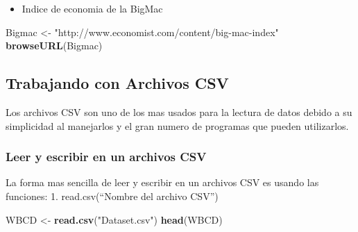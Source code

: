 \documentclass[]{article}
\newenvironment{Shaded}{\begin{snugshade}}{\end{snugshade}}
\newcommand{\KeywordTok}[1]{\textcolor[rgb]{0.13,0.29,0.53}{\textbf{#1}}}
\newcommand{\NormalTok}[1]{#1}
\newcommand{\StringTok}[1]{\textcolor[rgb]{0.31,0.60,0.02}{#1}}
\providecommand{\tightlist}{%
  \setlength{\itemsep}{0pt}\setlength{\parskip}{0pt}}
\begin{document}
\begin{itemize}
\tightlist
\item
  Indice de economia de la BigMac
\end{itemize}

\begin{Shaded}
\begin{Highlighting}[]
\NormalTok{Bigmac <-}\StringTok{ "http://www.economist.com/content/big-mac-index"}
\KeywordTok{browseURL}\NormalTok{(Bigmac)}
\end{Highlighting}
\end{Shaded}

\hypertarget{trabajando-con-archivos-csv}{%
\subsection{Trabajando con Archivos
CSV}\label{trabajando-con-archivos-csv}}

Los archivos CSV son uno de los mas usados para la lectura de datos
debido a su simplicidad al manejarlos y el gran numero de programas que
pueden utilizarlos.

\hypertarget{leer-y-escribir-en-un-archivos-csv}{%
\subsubsection{Leer y escribir en un archivos
CSV}\label{leer-y-escribir-en-un-archivos-csv}}

La forma mas sencilla de leer y escribir en un archivos CSV es usando
las funciones: 1. read.csv(``Nombre del archivo CSV'')

\begin{Shaded}
\begin{Highlighting}[]
\NormalTok{WBCD <-}\StringTok{ }\KeywordTok{read.csv}\NormalTok{(}\StringTok{"Dataset.csv"}\NormalTok{)}
\KeywordTok{head}\NormalTok{(WBCD)}
\end{Highlighting}
\end{Shaded}
\end{document}
